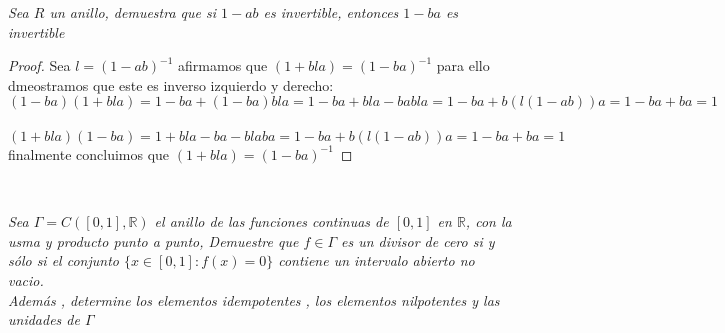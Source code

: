 \documentclass[11pt,letterpaper]{article}
\newcommand{\R}{\mathbb{R}}
\begin{document}
\begin{tcolorbox}[
	title = \textcolor{black}{\textcolor{white}{Problema 4}},]
\textit{Sea $R$ un anillo, demuestra que si $1-ab$ es invertible, entonces $1-ba$ es invertible
}
\end{tcolorbox}
\begin{proof}
    Sea $l=(1-ab)^{-1}$ afirmamos que $(1+bla)=(1-ba)^{-1}$ para ello dmeostramos que este es inverso izquierdo y derecho:\,\\
    \begin{equation*}
        (1-ba)(1+bla)=1-ba+(1-ba)bla=1-ba+bla-babla=1-ba+b(l(1-ab))a=1-ba+ba=1
    \end{equation*}
    \,\\
    \begin{equation*}
        (1+bla)(1-ba)=1+bla-ba-blaba=1-ba+b(l(1-ab))a=1-ba+ba=1
    \end{equation*}
    finalmente concluimos que $(1+bla)=(1-ba)^{-1}$
\end{proof}\,\\
\begin{tcolorbox}[
	title = \textcolor{black}{\textcolor{white}{Problema 5}},]
\textit{Sea $\Gamma=C([0,1],\R)$ el anillo de las funciones continuas de $[0,1]$ en $\R$, con la usma y producto punto a punto,
Demuestre que $f\in \Gamma$ es un divisor de cero si y s\'olo si el conjunto $\{x\in [0,1]:f(x)=0\}$ contiene un intervalo abierto no vacio.\,\\
Adem\'as , determine los elementos idempotentes , los elementos nilpotentes y las unidades de $\Gamma$
}
\end{tcolorbox}
\end{document}

